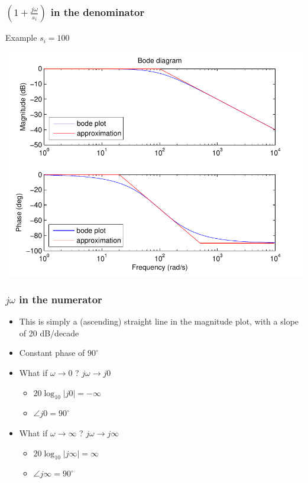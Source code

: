 \begin{frame}
\frametitle{$(1+\frac{j\omega}{s_i})$ in the denominator}
Example $s_i = 100$

\begin{center}
\includegraphics[scale=0.5]{BodeDenominator}
\end{center}

\end{frame}


\begin{frame}
\frametitle{$j\omega$ in the numerator}

\begin{itemize}
\item This is simply a (ascending) straight line in the magnitude plot, with a slope of 20 dB/decade
\item Constant phase of $90^{\circ}$
\end{itemize}

\begin{itemize}
\item What if $\omega \rightarrow 0$ ? \quad $j\omega \rightarrow j0$
\begin{itemize}
\item $20\log_{10}|j0| = -\infty$
\item $\angle j0 = 90^{\circ}$
\end{itemize}

\item What if $\omega \rightarrow \infty$ ?  \quad  $j\omega \rightarrow j\infty$
\begin{itemize}
\item $20\log_{10}|j\infty| = \infty$
\item $\angle j\infty = 90^{\circ}$
\end{itemize}
\end{itemize}

\end{frame}

